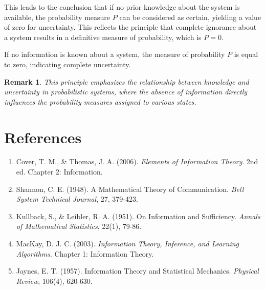 \documentclass[12pt,a4paper]{article}
\newenvironment{defbox}[1][]{%
  \begin{tcolorbox}[enhanced, breakable, colback=defcolor, colframe=green!50!black, title=#1, fonttitle=\bfseries, arc=3pt, boxrule=0.5pt]
}{\end{tcolorbox}}
\newtheorem{remark}{Remark}[section]
\begin{document}
This leads to the conclusion that if no prior knowledge about the system is available, the probability measure \( P \) can be considered as certain, yielding a value of zero for uncertainty. This reflects the principle that complete ignorance about a system results in a definitive measure of probability, which is \( P = 0 \).

\begin{defbox}[Principle of Probability]
If no information is known about a system, the measure of probability \( P \) is equal to zero, indicating complete uncertainty.
\end{defbox}

\begin{remark}
This principle emphasizes the relationship between knowledge and uncertainty in probabilistic systems, where the absence of information directly influences the probability measures assigned to various states.
\end{remark}

\section{References}
\begin{enumerate}
    \item Cover, T. M., & Thomas, J. A. (2006). \textit{Elements of Information Theory}. 2nd ed. Chapter 2: Information.
    \item Shannon, C. E. (1948). A Mathematical Theory of Communication. \textit{Bell System Technical Journal}, 27, 379-423.
    \item Kullback, S., & Leibler, R. A. (1951). On Information and Sufficiency. \textit{Annals of Mathematical Statistics}, 22(1), 79-86.
    \item MacKay, D. J. C. (2003). \textit{Information Theory, Inference, and Learning Algorithms}. Chapter 1: Information Theory.
    \item Jaynes, E. T. (1957). Information Theory and Statistical Mechanics. \textit{Physical Review}, 106(4), 620-630.
\end{enumerate}
\end{document}
